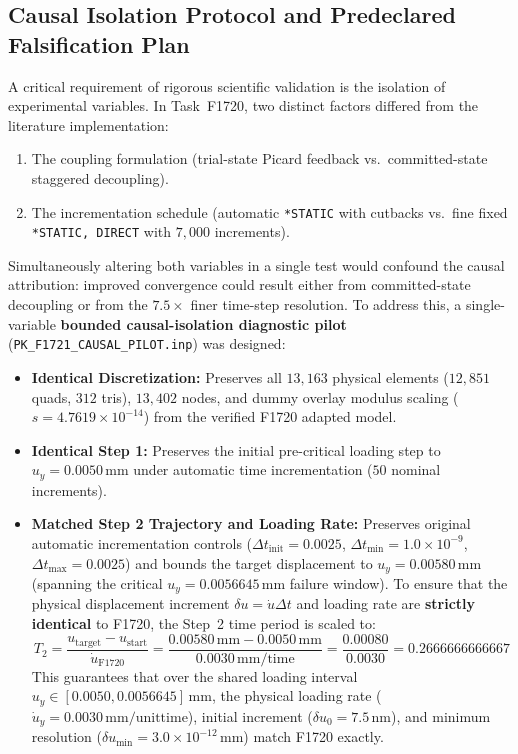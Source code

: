 \subsection{Causal Isolation Protocol and Predeclared Falsification Plan}
\label{subsec:f1721_causal_pilot}

A critical requirement of rigorous scientific validation is the isolation of experimental variables. In Task~F1720, two distinct factors differed from the literature implementation:
\begin{enumerate}
  \item The coupling formulation (trial-state Picard feedback vs.\ committed-state staggered decoupling).
  \item The incrementation schedule (automatic \texttt{*STATIC} with cutbacks vs.\ fine fixed \texttt{*STATIC, DIRECT} with $7{,}000$ increments).
\end{enumerate}

Simultaneously altering both variables in a single test would confound the causal attribution: improved convergence could result either from committed-state decoupling or from the $7.5\times$ finer time-step resolution. To address this, a single-variable \textbf{bounded causal-isolation diagnostic pilot} (\texttt{PK\_F1721\_CAUSAL\_PILOT.inp}) was designed:
\begin{itemize}
  \item \textbf{Identical Discretization:} Preserves all $13{,}163$ physical elements ($12{,}851$ quads, $312$ tris), $13{,}402$ nodes, and dummy overlay modulus scaling ($s = 4.7619 \times 10^{-14}$) from the verified F1720 adapted model.
  \item \textbf{Identical Step 1:} Preserves the initial pre-critical loading step to $u_y = 0.0050\,\mathrm{mm}$ under automatic time incrementation ($50$ nominal increments).
  \item \textbf{Matched Step 2 Trajectory and Loading Rate:} Preserves original automatic incrementation controls ($\Delta t_{\mathrm{init}} = 0.0025$, $\Delta t_{\min} = 1.0 \times 10^{-9}$, $\Delta t_{\max} = 0.0025$) and bounds the target displacement to $u_y = 0.00580\,\mathrm{mm}$ (spanning the critical $u_y = 0.0056645\,\mathrm{mm}$ failure window). To ensure that the physical displacement increment $\delta u = \dot{u} \Delta t$ and loading rate are \textbf{strictly identical} to F1720, the Step~2 time period is scaled to:
  \begin{equation}
    T_2 = \frac{u_{\mathrm{target}} - u_{\mathrm{start}}}{\dot{u}_{\mathrm{F1720}}} = \frac{0.00580\,\mathrm{mm} - 0.0050\,\mathrm{mm}}{0.0030\,\mathrm{mm/time}} = \frac{0.00080}{0.0030} = 0.2666666666667
    \label{eq:t2_matched_rate}
  \end{equation}
  This guarantees that over the shared loading interval $u_y \in [0.0050, 0.0056645]\,\mathrm{mm}$, the physical loading rate ($\dot{u}_y = 0.0030\,\mathrm{mm/unit time}$), initial increment ($\delta u_0 = 7.5\,\mathrm{nm}$), and minimum resolution ($\delta u_{\min} = 3.0 \times 10^{-12}\,\mathrm{mm}$) match F1720 exactly.
\end{itemize}

